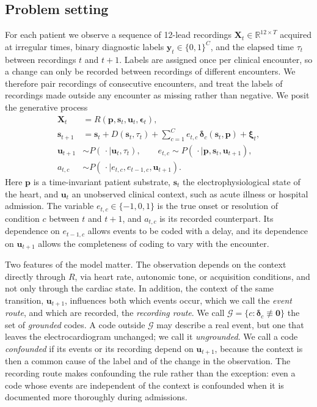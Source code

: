 \subsection{Problem setting}
\label{sec:wm-setting}

For each patient we observe a sequence of 12-lead recordings $\mathbf{X}_t\in\mathbb{R}^{12\times T}$ acquired at irregular times, binary diagnostic labels $\mathbf{y}_t\in\{0,1\}^{C}$, and the elapsed time $\tau_t$ between recordings $t$ and $t+1$. Labels are assigned once per clinical encounter, so a change can only be recorded between recordings of different encounters. We therefore pair recordings of consecutive encounters, and treat the labels of recordings made outside any encounter as missing rather than negative. We posit the generative process
\begin{align}
\mathbf{X}_t &= R(\mathbf{p},\mathbf{s}_t,\mathbf{u}_t,\boldsymbol{\epsilon}_t), \label{eq:wm-obs}\\
\mathbf{s}_{t+1} &= \mathbf{s}_t + D(\mathbf{s}_t,\tau_t) + \sum_{c=1}^{C} e_{t,c}\,\boldsymbol{\delta}_c(\mathbf{s}_t,\mathbf{p}) + \boldsymbol{\xi}_t, \label{eq:wm-state}\\
\mathbf{u}_{t+1} &\sim P(\,\cdot\mid\mathbf{u}_t,\tau_t), \qquad e_{t,c}\sim P(\,\cdot\mid\mathbf{p},\mathbf{s}_t,\mathbf{u}_{t+1}), \label{eq:wm-events}\\
a_{t,c} &\sim P(\,\cdot\mid e_{t,c},e_{t-1,c},\mathbf{u}_{t+1}). \label{eq:wm-labels}
\end{align}
Here $\mathbf{p}$ is a time-invariant patient substrate, $\mathbf{s}_t$ the electrophysiological state of the heart, and $\mathbf{u}_t$ an unobserved clinical context, such as acute illness or hospital admission. The variable $e_{t,c}\in\{-1,0,1\}$ is the true onset or resolution of condition $c$ between $t$ and $t+1$, and $a_{t,c}$ is its recorded counterpart. Its dependence on $e_{t-1,c}$ allows events to be coded with a delay, and its dependence on $\mathbf{u}_{t+1}$ allows the completeness of coding to vary with the encounter.

Two features of the model matter. The observation depends on the context directly through $R$, via heart rate, autonomic tone, or acquisition conditions, and not only through the cardiac state. In addition, the context of the same transition, $\mathbf{u}_{t+1}$, influences both which events occur, which we call the \emph{event route}, and which are recorded, the \emph{recording route}. We call $\mathcal{G}=\{c:\boldsymbol{\delta}_c\not\equiv\mathbf{0}\}$ the set of \emph{grounded} codes. A code outside $\mathcal{G}$ may describe a real event, but one that leaves the electrocardiogram unchanged; we call it \emph{ungrounded}. We call a code \emph{confounded} if its events or its recording depend on $\mathbf{u}_{t+1}$, because the context is then a common cause of the label and of the change in the observation. The recording route makes confounding the rule rather than the exception: even a code whose events are independent of the context is confounded when it is documented more thoroughly during admissions.

